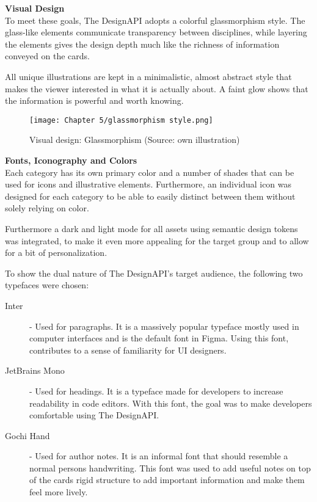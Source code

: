 \textbf{Visual Design}\\
To meet these goals, The DesignAPI adopts a colorful glassmorphism style. The glass-like elements
communicate transparency between disciplines, while layering the elements gives the design depth
much like the richness of information conveyed on the cards.

All unique illustrations are kept in a minimalistic, almost abstract style that makes the viewer
interested in what it is actually about. A faint glow shows that the information is powerful and
worth knowing.

\begin{figure}[H]
      \centering
      \texttt{[image: Chapter 5/glassmorphism style.png]}
      \caption{Visual design: Glassmorphism (Source: own illustration)}
\end{figure}

\textbf{Fonts, Iconography and Colors}\\
Each category has its own primary color and a number of shades that can be used for icons and
illustrative elements. Furthermore, an individual icon was designed for each category to be able to
easily distinct between them without solely relying on color.

Furthermore a dark and light mode for all assets using semantic design tokens was integrated, to
make it even more appealing for the target group and to allow for a bit of personalization.

To show the dual nature of The DesignAPI's target audience, the following two typefaces were chosen:
\begin{description}
      \item[Inter] - Used for paragraphs. It is a massively popular typeface mostly used in
            computer interfaces and is the default font in Figma. Using this font, contributes to a
            sense of familiarity for UI designers. 

      \item[JetBrains Mono] - Used for headings. It is a typeface made for developers to increase
            readability in code editors. With this font, the goal was to make developers comfortable
            using The DesignAPI. 

      \item[Gochi Hand] - Used for author notes. It is an informal font that should resemble a normal
            persons handwriting. This font was used to add useful notes on top of the cards rigid structure
            to add important information and make them feel more lively.
\end{description}

